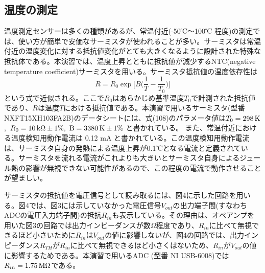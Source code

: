 \documentclass{jsarticle}
\begin{document}
\subsection{温度の測定}
温度測定センサーは多くの種類があるが、常温付近(-50℃〜100℃ 程度)の測定では、使い方が簡単で安価なサーミスタが使われることが多い。サーミスタは常温付近の温度変化に対する抵抗値変化がとても大きくなるように設計された特殊な抵抗体である。本演習では、温度上昇とともに抵抗値が減少するNTC(negative temperature coefficient)サーミスタを用いる。サーミスタ抵抗値の温度依存性は
\begin{equation}
 R=R_{0}\exp{{\bigg [}B{\bigg (}\frac{1}{T}-\frac{1}{T_{0}}{\bigg )}{\bigg ]}}
\end{equation}
という式で近似される。ここで$R_{0}$はあらかじめ基準温度$T_{0}$で計測された抵抗値であり、$R$は温度$T$における抵抗値である。本演習で用いるサーミスタ(型番 NXFT15XH103FA2B)のデータシートには、式(108)のパラメータ値は$T_{0}=298 \,\rm{K}$,\ $R_{0}=10 \,\rm{k}\Omega \pm1\%,\ B=3380 \,\rm{K}\pm1\% $ と書かれている。 また、常温付近における温度検知用動作電流は 0.12 mA と書かれている。この温度検知用動作電流は、サーミスタ自身の発熱による温度上昇が0.1℃となる電流と定義されている。サーミスタを流れる電流がこれよりも大きいとサーミスタ自身によるジュール熱の影響が無視できない可能性があるので、この程度の電流で動作させることが望ましい。

サーミスタの抵抗値を電圧信号として読み取るには、図4に示した回路を用いる。図4では、図3には示していなかった電圧信号$V_{out}$の出力端子間(すなわちADCの電圧入力端子間)の抵抗$R_{in}$も表示している。その理由は、オペアンプを用いた図3の回路では出力インピーダンスが数$\Omega$程度であり、$R_{in}$に比べて無視できるほど小さいために$R_{in}$は$V_{out}$の値に影響しないが、図4の回路では、出力インピーダンス$R_{TH}$が$R_{in}$に比べて無視できるほど小さくはないため、$R_{in}$が$V_{out}$の値に影響するためである。本演習で用いるADC (型番 NI USB-6008)では$R_{in}=1.75\, \rm{M}\Omega$である。
\end{document}
